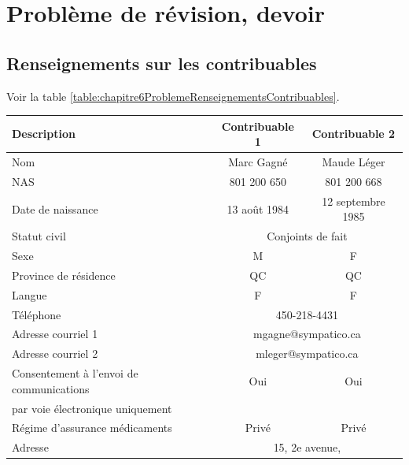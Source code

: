 \section{Problème de révision, devoir }
\subsection{Renseignements sur les contribuables}
Voir la table \ref{table:chapitre6ProblemeRenseignementsContribuables}.
\begin{table}
	\centering
	\begin{tabular}{|l|c|c|}
		\hline
		\rowcolor{LightGreen}Description         & Contribuable 1 &        Contribuable 2        \\ \hline
		Nom                                      &   Marc Gagné   &         Maude Léger          \\ \hline
		NAS                                      &  801 200 650   &         801 200 668          \\ \hline
		Date de naissance                        &  13 août 1984  &      12 septembre 1985       \\ \hline
		Statut civil                             &    \multicolumn{2}{c|}{Conjoints de fait}     \\ \hline
		Sexe                                     &       M        &              F               \\ \hline
		Province de résidence                    &       QC       &              QC              \\ \hline
		Langue                                   &       F        &              F               \\ \hline
		Téléphone                                &       \multicolumn{2}{c|}{450-218-4431}       \\ \hline
		Adresse courriel 1                       &   \multicolumn{2}{c|}{mgagne@sympatico.ca}    \\ \hline
		Adresse courriel 2                       &   \multicolumn{2}{c|}{mleger@sympatico.ca}    \\ \hline
		Consentement à l'envoi de communications &      Oui       &             Oui              \\
		par voie électronique uniquement         &                &                              \\ \hline
		Régime d'assurance médicaments           &     Privé      &            Privé             \\ \hline
		Adresse                                  &      \multicolumn{2}{c|}{15, 2e avenue,}      \\

\end{tabular}
\end{table}
